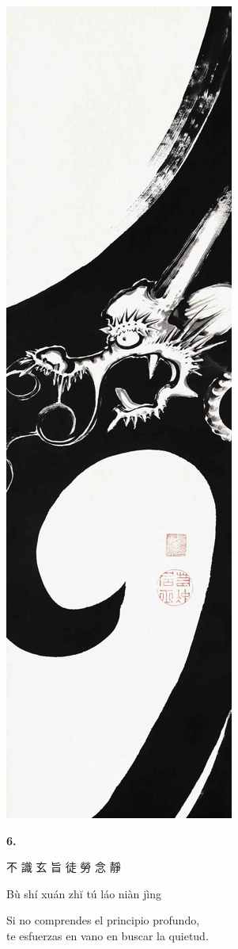 \documentclass[
  a5paperpaper,
]{article}
\begin{document}
\hypertarget{01}{}
\includegraphics{../img/image02.jpg}

\begin{verseblock}

\newpage

\begin{center}\textbf{6.}\end{center}

不 識 玄 旨 徒 勞 念 靜

Bù shí xuán zhĭ tú láo niàn jìng

Si no comprendes el principio profundo,\\
te esfuerzas en vano en buscar la quietud.

\end{verseblock}
\end{document}
